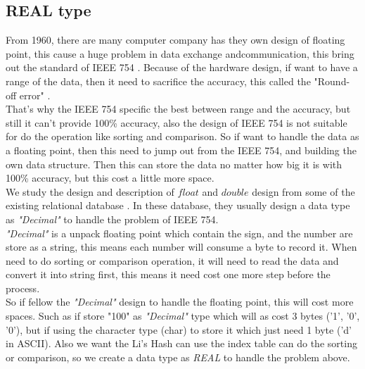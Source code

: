 \subsection{REAL type}

From 1960, there are many computer company has they own design of floating point, this cause a huge problem in data exchange andcommunication, this bring out the standard of IEEE 754 \cite{web:wiki:ieee-754}. Because of the hardware design, if want to have a range of the data, then it need to sacrifice the accuracy, this called the "Round-off error" \cite{web:wiki:round-off_error,web:c:handle-round-off_error}.\\

That's why the IEEE 754 specific the best between range and the accuracy, but still it can't provide 100\% accuracy, also the design of IEEE 754 is not suitable for do the operation like sorting and comparison. So if want to handle the data as a floating point, then this need to jump out from the IEEE 754, and building the own data structure. Then this can store the data no matter how big it is with 100\% accuracy, but this cost a little more space.\\

We study the design and description of $float$ and $double$ design from some of the existing relational database \cite{web:wiki:floating_point,web:wiki:double-precision_floating-point_format,web:wiki:real-number,web:vcpp:data-type-ranges,web:wiki:c-data-types,web:c:data-types,web:transact-sql:int-bigint-smallint-tinyint,web:transact-sql:effective_number_of_bits-decimal_places-length,web:transact-sql:float-real,web:csharp:decimal,web:sql-server:decimal-float-real,web:c-cpp:floating-point-precision,web:mysql:query-sorting-numbers,web:mysql:using-decimal-to-record-float-point,web:mysql:sql-manual-reference}. In these database, they usually design a data type as \textit{"Decimal"} to handle the problem of IEEE 754.\\

\textit{"Decimal"} is a unpack floating point which contain the sign, and the number are store as a string, this means each number will consume a byte to record it. When need to do sorting or comparison operation, it will need to read the data and convert it into string first, this means it need cost one more step before the process.\\

So if fellow the \textit{"Decimal"} design to handle the floating point, this will cost more spaces. Such as if store "100" as \textit{"Decimal"} type which will as cost 3 bytes ('1', '0', '0'), but if using the character type (char) to store it which just need 1 byte ('d' in ASCII). Also we want the Li's Hash can use the index table can do the sorting or comparison, so we create a data type as \textit{REAL} to handle the problem above.\\


